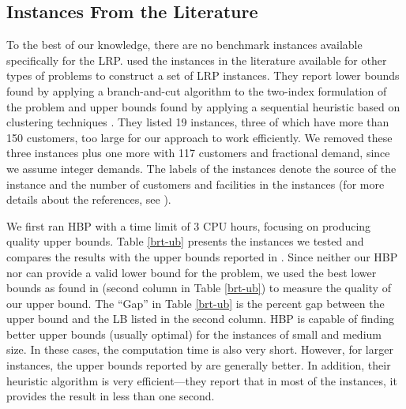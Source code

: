 \subsection{Instances From the Literature}
To the best of our knowledge, there are no benchmark instances
available specifically for the LRP. \citet{Barreto07} used the
instances in the literature available for other types of problems to
construct a set of LRP instances. They report lower bounds found by
applying a branch-and-cut algorithm to the two-index formulation of
the problem \citep{Barreto04} and upper bounds found by applying
a sequential heuristic based on clustering techniques
\citep{Barreto07}. They listed 19 instances, three of which have
more than 150 customers, too large for our approach to work
efficiently. We removed these three instances plus one more with 117
customers and fractional demand, since we assume integer demands. The
labels of the instances denote the source of the instance and the
number of customers and facilities in the instances
(for more details about the references, see \citet{Barreto-data}).

We first ran HBP with a time limit of 3 CPU hours, focusing on
producing quality upper bounds. 
Table \ref{brt-ub} presents the instances we tested and compares the
results with the upper bounds reported in \citet{Barreto07}. Since
neither our HBP nor \citet{Barreto07} can provide a valid lower bound
for the problem, we used the best lower bounds as found in
\citet{Barreto04} (second column in Table \ref{brt-ub}) to measure the
quality of our upper bound. The ``Gap'' in Table \ref{brt-ub} is the
percent gap between the upper bound and the LB listed in the second column. HBP
is capable of finding better upper bounds (usually optimal) for the
instances of small and medium size. In these cases, the computation
time is also very short. However, for larger instances, the upper
bounds reported by \citet{Barreto07} are generally better. In
addition, their heuristic algorithm is very efficient---they report
that in most of the instances, it provides the result in less than one
second.

